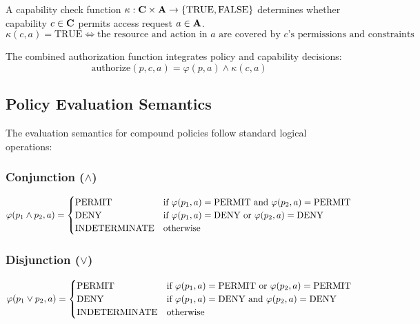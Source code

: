 \begin{definition}
\label{def:capability-check-function}
A capability check function $\kappa: \mathbf{C} \times \mathbf{A} \to \{\text{TRUE}, \text{FALSE}\}$ determines whether capability $c \in \mathbf{C}$ permits access request $a \in \mathbf{A}$.
\begin{equation}
\kappa(c,a) = \text{TRUE} \iff \text{the resource and action in } a \text{ are covered by } c\text{'s permissions and constraints}
\end{equation}
\end{definition}

\begin{definition}
\label{def:combined-authorization-function}
The combined authorization function integrates policy and capability decisions:
\begin{equation}
\text{authorize}(p, c, a) = \varphi(p, a) \land \kappa(c, a)
\end{equation}
\end{definition}

\subsection{Policy Evaluation Semantics}

The evaluation semantics for compound policies follow standard logical operations:

\subsubsection{Conjunction ($\land$)}
\begin{equation}
\varphi(p_1 \land p_2, a) = \begin{cases}
\text{PERMIT} & \text{if } \varphi(p_1, a) = \text{PERMIT} \text{ and } \varphi(p_2, a) = \text{PERMIT} \\
\text{DENY} & \text{if } \varphi(p_1, a) = \text{DENY} \text{ or } \varphi(p_2, a) = \text{DENY} \\
\text{INDETERMINATE} & \text{otherwise}
\end{cases}
\end{equation}

\subsubsection{Disjunction ($\lor$)}
\begin{equation}
\varphi(p_1 \lor p_2, a) = \begin{cases}
\text{PERMIT} & \text{if } \varphi(p_1, a) = \text{PERMIT} \text{ or } \varphi(p_2, a) = \text{PERMIT} \\
\text{DENY} & \text{if } \varphi(p_1, a) = \text{DENY} \text{ and } \varphi(p_2, a) = \text{DENY} \\
\text{INDETERMINATE} & \text{otherwise}
\end{cases}
\end{equation}

